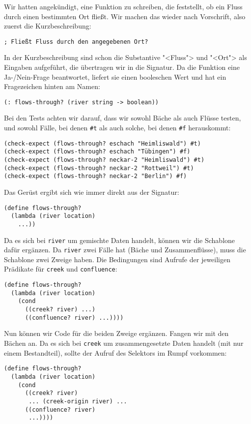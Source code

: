 Wir hatten angekündigt, eine Funktion zu schreiben, die feststellt, ob
ein Fluss durch einen bestimmten Ort fließt.  Wir machen das wieder
nach Vorschrift, also zuerst die Kurzbeschreibung:
%
\begin{lstlisting}
; Fließt Fluss durch den angegebenen Ort?
\end{lstlisting}
%
In der Kurzbeschreibung sind schon die Substantive "<Fluss"> und
"<Ort"> als Eingaben aufgeführt, die übertragen wir in die Signatur.
Da die Funktion eine Ja-/Nein-Frage beantwortet, liefert sie einen
booleschen Wert und hat ein Fragezeichen hinten am Namen:
%
\begin{lstlisting}
(: flows-through? (river string -> boolean))
\end{lstlisting}
%
Bei den Tests achten wir darauf, dass wir sowohl Bäche als auch Flüsse
testen, und sowohl Fälle, bei denen \lstinline{#t} als auch solche,
bei denen \lstinline{#f} herauskommt:
%
\begin{lstlisting}
(check-expect (flows-through? eschach "Heimliswald") #t)
(check-expect (flows-through? eschach "Tübingen") #f)
(check-expect (flows-through? neckar-2 "Heimliswald") #t)
(check-expect (flows-through? neckar-2 "Rottweil") #t)
(check-expect (flows-through? neckar-2 "Berlin") #f)
\end{lstlisting}
%
Das Gerüst ergibt sich wie immer direkt aus der Signatur:
%
\begin{lstlisting}
(define flows-through?
  (lambda (river location)
    ...))
\end{lstlisting}
%
Da es sich bei \lstinline{river} um gemischte Daten handelt, können
wir die Schablone dafür ergänzen.  Da \lstinline{river} zwei Fälle hat
(Bäche und Zusammenflüsse), muss die Schablone zwei Zweige haben.  Die
Bedingungen sind Aufrufe der jeweiligen Prädikate für
\lstinline{creek} und \lstinline{confluence}:
%
\begin{lstlisting}
(define flows-through?
  (lambda (river location)
    (cond
      ((creek? river) ...)
      ((confluence? river) ...))))
\end{lstlisting}
%
Nun können wir Code für die beiden Zweige ergänzen.  Fangen wir mit
den Bächen an.  Da es sich bei \lstinline{creek} um zusammengesetzte
Daten handelt (mit nur einem Bestandteil), sollte der Aufruf des
Selektors im Rumpf vorkommen:
%
\begin{lstlisting}
(define flows-through?
  (lambda (river location)
    (cond
      ((creek? river)
       ... (creek-origin river) ...
      ((confluence? river)
       ...))))
\end{lstlisting}
